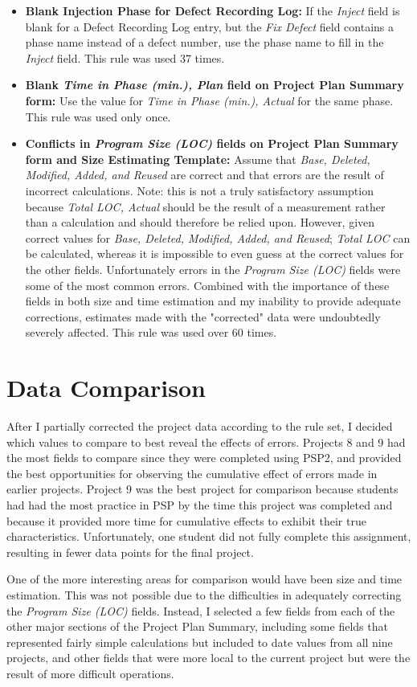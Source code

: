 \begin{itemize}
\item {\bf Blank Injection Phase for Defect Recording Log:} If the {\it
    Inject} field is blank for a Defect Recording Log entry, but the {\it
    Fix Defect} field contains a phase name instead of a defect number, use
  the phase name to fill in the {\it Inject} field.  This rule was used 37
  times.
  
\item {\bf Blank {\it Time in Phase (min.), Plan} field on Project Plan
    Summary form:} Use the value for {\it Time in Phase (min.), Actual} for
  the same phase.  This rule was used only once.
  
\item {\bf Conflicts in {\it Program Size (LOC)} fields on Project Plan
    Summary form and Size Estimating Template:} Assume that {\it Base,
    Deleted, Modified, Added, and Reused} are correct and that errors are
  the result of incorrect calculations.  Note: this is not a truly
  satisfactory assumption because {\it Total LOC, Actual} should be the
  result of a measurement rather than a calculation and should therefore be
  relied upon.  However, given correct values for {\it Base, Deleted,
    Modified, Added, and Reused}; {\it Total LOC} can be calculated,
  whereas it is impossible to even guess at the correct values for the
  other fields.  Unfortunately errors in the {\it Program Size (LOC)}
  fields were some of the most common errors.  Combined with the importance
  of these fields in both size and time estimation and my inability to
  provide adequate corrections, estimates made with the "corrected" data
  were undoubtedly severely affected.  This rule was used over 60 times.
\end{itemize}

\section{Data Comparison}
After I partially corrected the project data according to the rule set, I
decided which values to compare to best reveal the effects of errors.
Projects 8 and 9 had the most fields to compare since they were completed
using PSP2, and provided the best opportunities for observing the
cumulative effect of errors made in earlier projects.  Project 9 was the
best project for comparison because students had had the most practice in
PSP by the time this project was completed and because it provided more
time for cumulative effects to exhibit their true characteristics.
Unfortunately, one student did not fully complete this assignment,
resulting in fewer data points for the final project.

One of the more interesting areas for comparison would have been size and
time estimation.  This was not possible due to the difficulties in
adequately correcting the {\it Program Size (LOC)} fields.  Instead, I
selected a few fields from each of the other major sections of the Project
Plan Summary, including some fields that represented fairly simple
calculations but included to date values from all nine projects, and other
fields that were more local to the current project but were the result of
more difficult operations.

